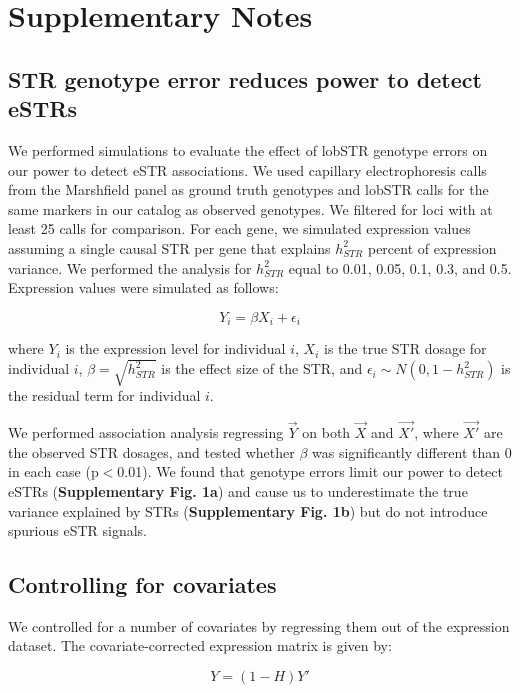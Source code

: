 \section{Supplementary Notes}
\label{sec:estrsupnote}

\subsection{STR genotype error reduces power to detect eSTRs}
We performed simulations to evaluate the effect of lobSTR genotype errors on our power to detect eSTR associations. We used capillary electrophoresis calls from the Marshfield panel as ground truth genotypes and lobSTR calls for the same markers in our catalog as observed genotypes. We filtered for loci with at least 25 calls for comparison. For each gene, we simulated expression values assuming a single causal STR per gene that explains $h^2_{STR}$ percent of expression variance. We performed the analysis for $h^2_{STR}$ equal to 0.01, 0.05, 0.1, 0.3, and 0.5. Expression values were simulated as follows:

\begin{equation}
Y_i = \beta X_i + \epsilon_i
\end{equation}

where $Y_i$ is the expression level for individual $i$, $X_i$ is the true STR dosage for individual $i$, $\beta=\sqrt{h^2_{STR} }$ is the effect size of the STR, and $\epsilon_i \sim N(0, 1-h^2_{STR})$ is the residual term for individual $i$.

We performed association analysis regressing $\vec{Y}$ on both $\vec{X}$ and $\vec{X'}$, where $\vec{X'}$ are the observed STR dosages, and tested whether $\beta$ was significantly different than 0 in each case (p$<$0.01). We found that genotype errors limit our power to detect eSTRs (\textbf{Supplementary Fig. 1a}) and cause us to underestimate the true variance explained by STRs (\textbf{Supplementary Fig. 1b}) but do not introduce spurious eSTR signals.

\subsection{Controlling for covariates}
We controlled for a number of covariates by regressing them out of the
expression dataset. The covariate-corrected expression matrix is given
by:

\begin{equation}
Y = (1-H)Y'
\end{equation}


